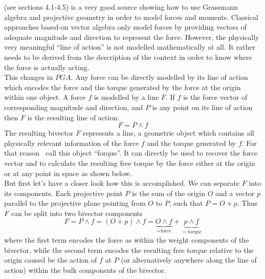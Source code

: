 \cite{Browne_Grassmann-Algebra_Vol1:2012} (see sections 4.1-4.5) is a very good source
showing how to use Grassmann algebra and projective geometry in order to model forces and
moments. Classical approaches based-on vector algebra only model forces by providing
vectors of adequate magnitude and direction to represent the force. However, the
physically very meaningful ``line of action'' is not modelled mathematically at all. It
rather needs to be derived from the description of the context in order to know where the
force is actually acting. \\

This changes in $PGA$. Any force can be directly modelled by its line of action which
encodes the force and the torque generated by the force at the origin within one object. A
force $f$ is modelled by a line $F$. If $f$ is the force vector of corresponding magnitude
and direction, and $P$ is any point on its line of action then $F$ is the resulting line
of action:
\begin{equation}
F = P \wedge f
\label{eq:line_of_action}
\end{equation}
The resulting bivector $F$ represents a line, a geometric object which contains all
physically relevant information of the force $f$ and the torque generated by $f$. For that
reason~\cite{Dynamics_in_PGA_plane-based_Dorst-DeKennik:2023} call this object ``forque''.
It can directly be used to recover the force vector and to calculate the resulting free
torque by the force either at the origin or at any point in space as shown below. \\

But first let's have a closer look how this is accomplished. We can separate $F$ into its
components. Each projective point $P$ is the sum of the origin $O$ and a vector $p$
parallel to the projective plane pointing from $O$ to $P$, such that $P = O + p$. Thus $F$
can be split into two bivector components
\begin{equation}
F = P \wedge f = (O + p) \wedge f =
\underbrace{O \wedge f}_{\text{=force}} + \underbrace{p \wedge f}_{=torque}
\label{eq:line_of_action_components}
\end{equation}
where the first term encodes the force as within the weight components of the bivector,
while the second term encodes the resulting free torque relative to the origin caused be
the action of $f$ at $P$ (or alternatively anywhere along the line of action) within the
bulk components of the bivector. \\

